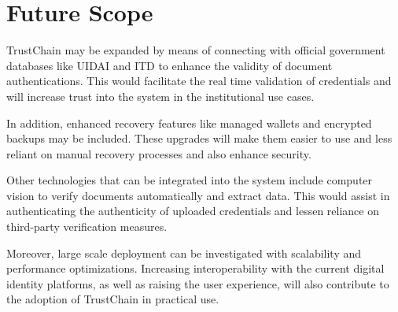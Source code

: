 


\section{Future Scope}
TrustChain may be expanded by means of connecting with official government databases like UIDAI and ITD to enhance the validity of document authentications. This would facilitate the real time validation of credentials and will increase trust into the system in the institutional use cases. 

In addition, enhanced recovery features like managed wallets and encrypted backups may be included. These upgrades will make them easier to use and less reliant on manual recovery processes and also enhance security.

Other technologies that can be integrated into the system include computer vision to verify documents automatically and extract data. This would assist in authenticating the authenticity of uploaded credentials and lessen reliance on third-party verification measures.

Moreover, large scale deployment can be investigated with scalability and performance optimizations. Increasing interoperability with the current digital identity platforms, as well as raising the user experience, will also contribute to the adoption of TrustChain in practical use.


